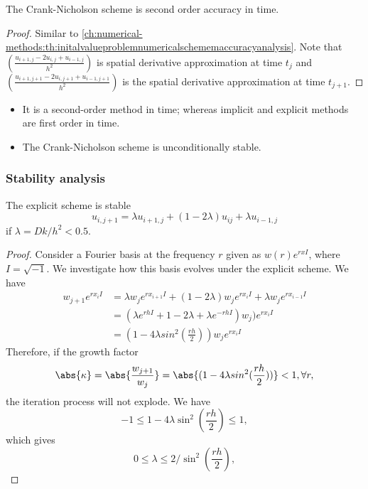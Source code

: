 \begin{refsection}
\begin{lemma}
The Crank-Nicholson scheme is second order accuracy in time. 
\end{lemma}
\begin{proof}
Similar to \autoref{ch:numerical-methods:th:initalvalueproblemnumericalschememaccuracyanalysis}.
Note that $(\frac{u_{i+1,j} - 2u_{i,j} + u_{i-1,j}}{h^2})$ is spatial derivative approximation at time $t_j$ and $(\frac{u_{i+1,j+1} - 2u_{i,j+1} + u_{i-1,j+1}}{h^2})$ is the spatial derivative approximation at time $t_{j+1}$.
\end{proof}


\begin{remark}\hfill
	\begin{itemize}
		\item  It is a second-order method in time; whereas implicit and explicit methods are first order in time. 
		\item The Crank-Nicholson scheme is unconditionally stable.
	\end{itemize}	
\end{remark}

\subsubsection{Stability analysis}



\begin{lemma}\cite[95]{holmes2007introduction}
	The explicit scheme is stable
	$$u_{i,j+1} = \lambda u_{i+1,j} + (1-2\lambda) u_{ij} + \lambda u_{i-1,j}$$
	 if $\lambda = Dk/h^2 < 0.5$.
\end{lemma}
\begin{proof}
	Consider a Fourier basis at the frequency $r$ given as $w(r)e^{rxI}$, where $I = \sqrt{-1}$. We investigate how this basis evolves under the explicit scheme. We have
	\begin{align*}
	w_{j+1}e^{rx_iI} &= \lambda w_j e^{rx_{i+1}I} + (1-2\lambda) w_j e^{rx_i I} + \lambda w_j e^{rx_{i-1}I} \\
	& = (\lambda e^{rhI} + 1 - 2\lambda + \lambda e^{-rhI}) w_j )e^{rx_i I} \\
	& = (1-4\lambda sin^2(\frac{rh}{2})) w_j e^{rx_i I}
	\end{align*}
	Therefore, if the growth factor
	$$\abs{\kappa} = \abs{\frac{w_{j+1}}{w_j}} = \abs{(1-4\lambda sin^2(\frac{rh}{2}))}<1,\forall r,$$ the iteration process will not explode.
We have
$$-1\leq 1-4\lambda \sin^2(\frac{rh}{2}) \leq 1,$$
which gives
$$0\leq \lambda \leq 2/\sin^2(\frac{rh}{2}),$$


\end{proof}
\end{refsection}
